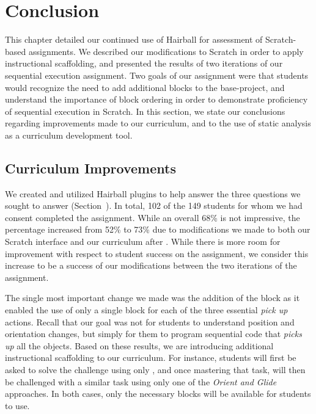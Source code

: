 \section{Conclusion} 
This chapter detailed our continued use of Hairball for assessment of
Scratch-based assignments. We described our modifications to Scratch in order
to apply instructional scaffolding, and presented the results of two iterations
of our sequential execution assignment. Two goals of our assignment were that
students would recognize the need to add additional blocks to the base-project,
and understand the importance of block ordering in order to demonstrate
proficiency of sequential execution in Scratch. In this section, we state our
conclusions regarding improvements made to our curriculum, and to the use of
static analysis as a curriculum development tool.

\subsection{Curriculum Improvements}
We created and utilized Hairball plugins to help answer the three questions we
sought to answer (Section~). In total, 102 of the 149
students for whom we had consent completed the assignment. While an overall
68\% is not impressive, the percentage increased from 52\% to 73\% due to
modifications we made to both our Scratch interface and our curriculum after
\sone{}. While there is more room for improvement with respect to student
success on the assignment, we consider this increase to be a success of our
modifications between the two iterations of the assignment.

The single most important change we made was the addition of the \glideto{}
block as it enabled the use of only a single block for each of the three
essential \emph{pick up} actions. Recall that our goal was not for students to
understand position and orientation changes, but simply for them to program
sequential code that \emph{picks up} all the objects. Based on these results,
we are introducing additional instructional scaffolding to our curriculum. For
instance, students will first be asked to solve the challenge using only
\glideto{}, and once mastering that task, will then be challenged with a
similar task using only one of the \emph{Orient and Glide} approaches. In both
cases, only the necessary blocks will be available for students to use.

